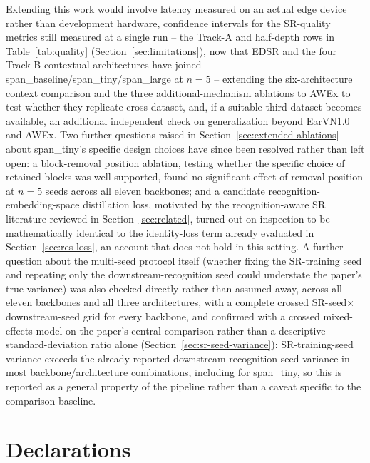 \documentclass[11pt]{article}
\begin{document}
Extending this work would involve latency measured on an actual edge device rather than development hardware, confidence intervals for the SR-quality metrics still measured at a single run -- the Track-A and half-depth rows in Table~\ref{tab:quality} (Section~\ref{sec:limitations}), now that EDSR and the four Track-B contextual architectures have joined span\_baseline/span\_tiny/span\_large at $n=5$ -- extending the six-architecture context comparison and the three additional-mechanism ablations to AWEx to test whether they replicate cross-dataset, and, if a suitable third dataset becomes available, an additional independent check on generalization beyond EarVN1.0 and AWEx. Two further questions raised in Section~\ref{sec:extended-ablations} about span\_tiny's specific design choices have since been resolved rather than left open: a block-removal position ablation, testing whether the specific choice of retained blocks was well-supported, found no significant effect of removal position at $n=5$ seeds across all eleven backbones; and a candidate recognition-embedding-space distillation loss, motivated by the recognition-aware SR literature reviewed in Section~\ref{sec:related}, turned out on inspection to be mathematically identical to the identity-loss term already evaluated in Section~\ref{sec:res-loss}, an account that does not hold in this setting. A further question about the multi-seed protocol itself (whether fixing the SR-training seed and repeating only the downstream-recognition seed could understate the paper's true variance) was also checked directly rather than assumed away, across all eleven backbones and all three architectures, with a complete crossed SR-seed$\times$downstream-seed grid for every backbone, and confirmed with a crossed mixed-effects model on the paper's central comparison rather than a descriptive standard-deviation ratio alone (Section~\ref{sec:sr-seed-variance}): SR-training-seed variance exceeds the already-reported downstream-recognition-seed variance in most backbone/architecture combinations, including for span\_tiny, so this is reported as a general property of the pipeline rather than a caveat specific to the comparison baseline.

\section*{Declarations}
\end{document}
